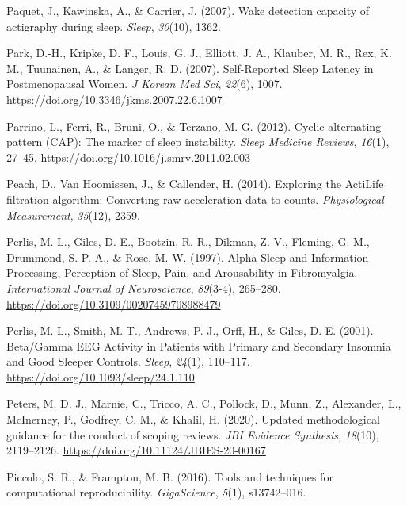 \documentclass[
]{article}
\newlength{\cslhangindent}
\newenvironment{CSLReferences}[2] %
 {\begin{list}{}{%
  \setlength{\itemindent}{0pt}
  \setlength{\leftmargin}{0pt}
  \setlength{\parsep}{0pt}
  \ifodd #1
   \setlength{\leftmargin}{\cslhangindent}
   \setlength{\itemindent}{-1\cslhangindent}
  \fi
  \setlength{\itemsep}{#2\baselineskip}}}
 {\end{list}}
\begin{document}
\begin{CSLReferences}{1}{0}
Paquet, J., Kawinska, A., \& Carrier, J. (2007). Wake detection capacity of actigraphy during sleep. \emph{Sleep}, \emph{30}(10), 1362.

Park, D.-H., Kripke, D. F., Louis, G. J., Elliott, J. A., Klauber, M. R., Rex, K. M., Tuunainen, A., \& Langer, R. D. (2007). Self-{Reported} {Sleep} {Latency} in {Postmenopausal} {Women}. \emph{J Korean Med Sci}, \emph{22}(6), 1007. \url{https://doi.org/10.3346/jkms.2007.22.6.1007}

Parrino, L., Ferri, R., Bruni, O., \& Terzano, M. G. (2012). {Cyclic alternating pattern (CAP): The marker of sleep instability}. \emph{Sleep Medicine Reviews}, \emph{16}(1), 27--45. \url{https://doi.org/10.1016/j.smrv.2011.02.003}

Peach, D., Van Hoomissen, J., \& Callender, H. (2014). Exploring the ActiLife{\textregistered} filtration algorithm: Converting raw acceleration data to counts. \emph{Physiological Measurement}, \emph{35}(12), 2359.

Perlis, M. L., Giles, D. E., Bootzin, R. R., Dikman, Z. V., Fleming, G. M., Drummond, S. P. A., \& Rose, M. W. (1997). Alpha {Sleep} and {Information} {Processing}, {Perception} of {Sleep}, {Pain}, and {Arousability} in {Fibromyalgia}. \emph{International Journal of Neuroscience}, \emph{89}(3-4), 265--280. \url{https://doi.org/10.3109/00207459708988479}

Perlis, M. L., Smith, M. T., Andrews, P. J., Orff, H., \& Giles, D. E. (2001). Beta/{Gamma} {EEG} {Activity} in {Patients} with {Primary} and {Secondary} {Insomnia} and {Good} {Sleeper} {Controls}. \emph{Sleep}, \emph{24}(1), 110--117. \url{https://doi.org/10.1093/sleep/24.1.110}

Peters, M. D. J., Marnie, C., Tricco, A. C., Pollock, D., Munn, Z., Alexander, L., McInerney, P., Godfrey, C. M., \& Khalil, H. (2020). {Updated methodological guidance for the conduct of scoping reviews}. \emph{JBI Evidence Synthesis}, \emph{18}(10), 2119--2126. \url{https://doi.org/10.11124/JBIES-20-00167}

Piccolo, S. R., \& Frampton, M. B. (2016). Tools and techniques for computational reproducibility. \emph{GigaScience}, \emph{5}(1), s13742--016.


\end{CSLReferences}
\end{document}
